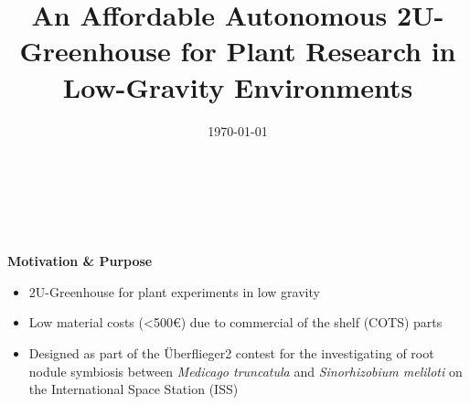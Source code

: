 \documentclass[english,final,20pt,leqno,print]{beamer}
\title %
[ELGRA Symposium 2024 -- 03.\,--\,06.09.2024 -- Liverpool, United Kingdom] %
{%
An Affordable Autonomous 2U-Greenhouse for Plant Research in Low-Gravity Environments
}
\author{%
\textbf{Dominik Woiwode\texorpdfstring{$^\dagger$}}, \textbf{Jakob Marten\texorpdfstring{$^\ddagger$}}, \normalsize Justin Sondheim, Dörthe Behrens, Nils Wörz, Natalija Hohnjec, Helge Küster, Holger Blume 
}
\institute
[Leibniz University Hannover] %
{
Leibniz University Hannover, \small $^\dagger$Institute for Information Processing, $^\ddagger$Institute of Microelectronic Systems
}
\date{\today}
\begin{document}
\begin{frame}[t]
\begin{center}%
\raggedright
{\color{colorLUHtitleblue}\fontsize{100}{90}\selectfont{\bfseries \inserttitle{}}\\[1ex]}
{\Large{\insertauthor}\\[0.7ex]}
{\normalsize{\insertinstitute}}
\end{center}
\vspace{0.5\verticalspacing}
\begin{columns}[T]

\begin{column}{.49\textwidth}
  \begin{block}{\strut{}\textbf{Motivation \& Purpose}}
    \begin{itemize}
      \item 2U-Greenhouse for plant experiments in low gravity
      \item Low material costs (<500€) due to commercial of the shelf (COTS) parts
      \item Designed as part of the Überflieger2 contest for the investigating of root nodule symbiosis between \textit{Medicago truncatula} and \textit{Sinorhizobium meliloti} on the International Space Station (ISS)~\textcolor{colorLUHblue}{\cite{biospektrum}}
    \end{itemize}
  \end{block}



\end{column}
\end{columns}
\end{frame}
\end{document}
